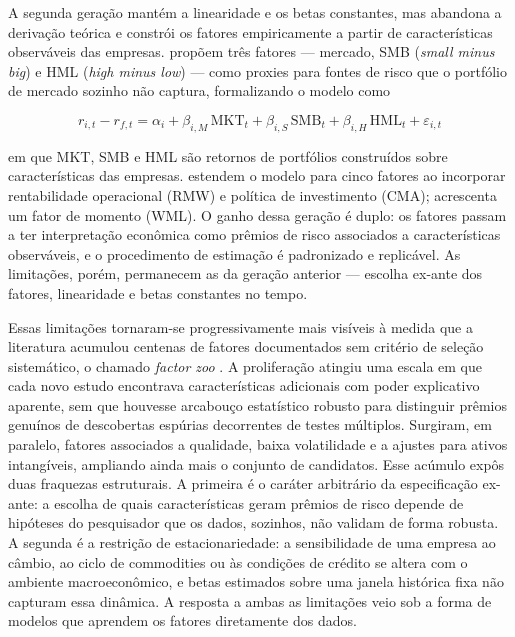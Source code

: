 A segunda geração mantém a linearidade e os betas constantes, mas abandona a derivação teórica e
constrói os fatores empiricamente a partir de características observáveis das empresas.
\textcite{fama1993} propõem três fatores --- mercado, SMB (\textit{small minus big}) e HML
(\textit{high minus low}) --- como proxies para fontes de risco que o portfólio de mercado sozinho
não captura, formalizando o modelo como

\begin{equation}
    r_{i,t} - r_{f,t} = \alpha_i + \beta_{i,M}\,\text{MKT}_t + \beta_{i,S}\,\text{SMB}_t + \beta_{i,H}\,\text{HML}_t + \varepsilon_{i,t}
    \label{eq:ff3}
\end{equation}

\noindent em que MKT, SMB e HML são retornos de portfólios construídos sobre características das
empresas. \textcite{fama2015} estendem o modelo para cinco fatores ao incorporar rentabilidade
operacional (RMW) e política de investimento (CMA); \textcite{carhart1997} acrescenta um fator de
momento (WML). O ganho dessa geração é duplo: os fatores passam a ter interpretação econômica como
prêmios de risco associados a características observáveis, e o procedimento de estimação é
padronizado e replicável. As limitações, porém, permanecem as da geração anterior --- escolha
ex-ante dos fatores, linearidade e betas constantes no tempo.

Essas limitações tornaram-se progressivamente mais visíveis à medida que a literatura acumulou
centenas de fatores documentados sem critério de seleção sistemático, o chamado \textit{factor zoo}
\parencite{harvey2016}. A proliferação atingiu uma escala em que cada novo estudo encontrava
características adicionais com poder explicativo aparente, sem que houvesse arcabouço estatístico
robusto para distinguir prêmios genuínos de descobertas espúrias decorrentes de testes múltiplos.
Surgiram, em paralelo, fatores associados a qualidade, baixa volatilidade e a ajustes para ativos
intangíveis, ampliando ainda mais o conjunto de candidatos. Esse acúmulo expôs duas fraquezas
estruturais. A primeira é o caráter arbitrário da especificação ex-ante: a escolha de quais
características geram prêmios de risco depende de hipóteses do pesquisador que os dados, sozinhos,
não validam de forma robusta. A segunda é a restrição de estacionariedade: a sensibilidade de uma
empresa ao câmbio, ao ciclo de commodities ou às condições de crédito se altera com o ambiente
macroeconômico, e betas estimados sobre uma janela histórica fixa não capturam essa dinâmica. A
resposta a ambas as limitações veio sob a forma de modelos que aprendem os fatores diretamente dos
dados.

